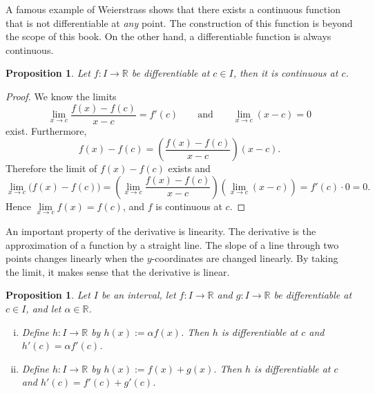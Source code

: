\documentclass[12pt]{book}
\newcommand{\R}{{\mathbb{R}}}
\theoremstyle{plain}
\newtheorem{prop}[thm]{Proposition}
\theoremstyle{remark}
\theoremstyle{definition}
\theoremstyle{exercise}
\theoremstyle{example}
\begin{document}
A famous example of Weierstrass shows that there exists a continuous
function that is not differentiable at \emph{any} point.  The construction
of this function is beyond the scope of this book.  On the other hand,
a differentiable function
is always continuous.

\begin{prop}
Let $f \colon I \to \R$ be differentiable at $c \in I$,
then it is continuous at $c$.
\end{prop}

\begin{proof}
We know the limits
\begin{equation*}
\lim_{x\to c}\frac{f(x)-f(c)}{x-c} = f'(c)
\qquad
\text{and}
\qquad
\lim_{x\to c}(x-c) = 0
\end{equation*}
exist.  Furthermore,
\begin{equation*}
f(x)-f(c) = 
\left( \frac{f(x)-f(c)}{x-c} \right) (x-c) .
\end{equation*}
Therefore the limit of $f(x)-f(c)$ exists and
\begin{equation*}
\lim_{x\to c} \bigl( f(x)-f(c) \bigr) =
\left(\lim_{x\to c} \frac{f(x)-f(c)}{x-c} \right)
\left(\lim_{x\to c} (x-c) \right) =
f'(c) \cdot 0  = 0.
\end{equation*}
Hence $\lim\limits_{x\to c} f(x) = f(c)$, and $f$ is continuous at $c$.
\end{proof}

An important property of the derivative is linearity.  The
derivative is the approximation of a function by a straight line.
The slope of a line through two points changes linearly when the
$y$-coordinates are changed linearly.  By taking the limit,
it makes sense that the derivative is linear.

\begin{prop}
Let $I$ be an interval, let
$f \colon I \to \R$ and $g \colon I \to \R$ be differentiable at $c \in I$,
and let $\alpha \in \R$.
\begin{enumerate}[(i)]
\item
Define $h \colon I \to \R$ by $h(x) := \alpha f(x)$.  Then
$h$ is differentiable at $c$ and
$h'(c) = \alpha f'(c)$.
\item
Define $h \colon I \to \R$ by $h(x) :=  f(x) + g(x)$.  Then
$h$ is differentiable at $c$ and
$h'(c) =  f'(c) + g'(c)$.
\end{enumerate}
\end{prop}
\end{document}
